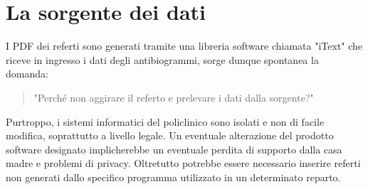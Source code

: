 \section{La sorgente dei dati}
I PDF dei referti sono generati tramite una libreria software chiamata "iText" che riceve in ingresso i dati degli antibiogrammi, sorge dunque spontanea la domanda: 
\begin{quotation}
  "Perché non aggirare il referto e prelevare i dati dalla sorgente?"
\end{quotation}
Purtroppo, i sistemi informatici del policlinico sono isolati e non di facile modifica, soprattutto a livello legale. Un eventuale alterazione del prodotto software designato implicherebbe un eventuale perdita di supporto dalla casa madre e problemi di privacy. Oltretutto potrebbe essere necessario inserire referti non generati dallo specifico programma utilizzato in un determinato reparto.



